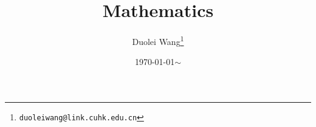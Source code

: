 \title{Mathematics}
\author{
	Duolei Wang\footnote{
		\texttt{duoleiwang@link.cuhk.edu.cn}
	} \\
}
\date{\today \( \sim \) }
